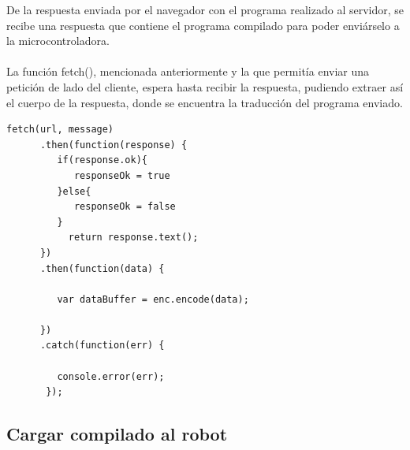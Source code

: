 \documentclass{report}
\begin{document}
De la respuesta enviada por el navegador con el programa realizado al servidor, se recibe una respuesta que contiene el programa compilado para poder enviárselo a la microcontroladora.
\\
\\
La función fetch(), mencionada anteriormente y la que permitía enviar una petición de lado del cliente, espera hasta recibir la respuesta, pudiendo extraer así el cuerpo de la respuesta, donde se encuentra la traducción del programa enviado.
\\
\begin{lstlisting}[frame=single,breaklines=true, label=Extracción del dato enviado en la respuesta, caption=Extracción del dato enviado en la respuesta, captionpos=b]
   fetch(url, message)
      .then(function(response) {
         if(response.ok){
            responseOk = true
         }else{
            responseOk = false
         }
           return response.text();
      })
      .then(function(data) {
        
         var dataBuffer = enc.encode(data);
           
      })
      .catch(function(err) {

         console.error(err);
       });

\end{lstlisting}

\subsection{Cargar compilado al robot}
\end{document}
